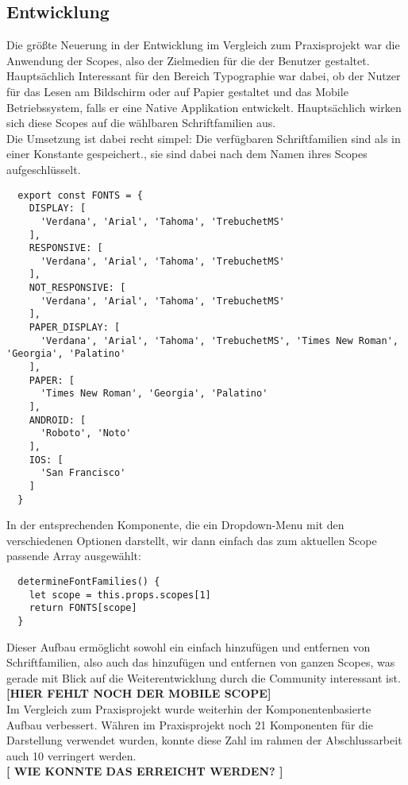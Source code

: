\subsection{Entwicklung}
Die größte Neuerung in der Entwicklung im Vergleich zum Praxisprojekt war die Anwendung der Scopes, also der Zielmedien für die der Benutzer gestaltet. Hauptsächlich Interessant für den Bereich Typographie war dabei, ob der Nutzer für das Lesen am Bildschirm oder auf Papier gestaltet und das Mobile Betriebssystem, falls er eine Native Applikation entwickelt. Hauptsächlich wirken sich diese Scopes auf die wählbaren Schriftfamilien aus.\\

Die Umsetzung ist dabei recht simpel: Die verfügbaren Schriftfamilien sind als in einer Konstante gespeichert., sie sind dabei nach dem Namen ihres Scopes aufgeschlüsselt.

\begin{lstlisting}
  export const FONTS = {
    DISPLAY: [
      'Verdana', 'Arial', 'Tahoma', 'TrebuchetMS'
    ],
    RESPONSIVE: [
      'Verdana', 'Arial', 'Tahoma', 'TrebuchetMS'
    ],
    NOT_RESPONSIVE: [
      'Verdana', 'Arial', 'Tahoma', 'TrebuchetMS'
    ],
    PAPER_DISPLAY: [
      'Verdana', 'Arial', 'Tahoma', 'TrebuchetMS', 'Times New Roman', 'Georgia', 'Palatino'
    ],
    PAPER: [
      'Times New Roman', 'Georgia', 'Palatino'
    ],
    ANDROID: [
      'Roboto', 'Noto'
    ],
    IOS: [
      'San Francisco'
    ]
  }
\end{lstlisting}

In der entsprechenden Komponente, die ein Dropdown-Menu mit den verschiedenen Optionen darstellt, wir dann einfach das zum aktuellen Scope passende Array ausgewählt:

\begin{lstlisting}
  determineFontFamilies() {
    let scope = this.props.scopes[1]
    return FONTS[scope]
  }
\end{lstlisting}

Dieser Aufbau ermöglicht sowohl ein einfach hinzufügen und entfernen von Schriftfamilien, also auch das hinzufügen und entfernen von ganzen Scopes, was gerade mit Blick auf die Weiterentwicklung durch die Community interessant ist.\\

\textbf{[HIER FEHLT NOCH DER MOBILE SCOPE]}\\

Im Vergleich zum Praxisprojekt wurde weiterhin der Komponentenbasierte Aufbau verbessert. Währen im Praxisprojekt noch 21 Komponenten für die Darstellung verwendet wurden, konnte diese Zahl im rahmen der Abschlussarbeit auch 10 verringert werden.\\
\textbf{[ WIE KONNTE DAS ERREICHT WERDEN? ]}

